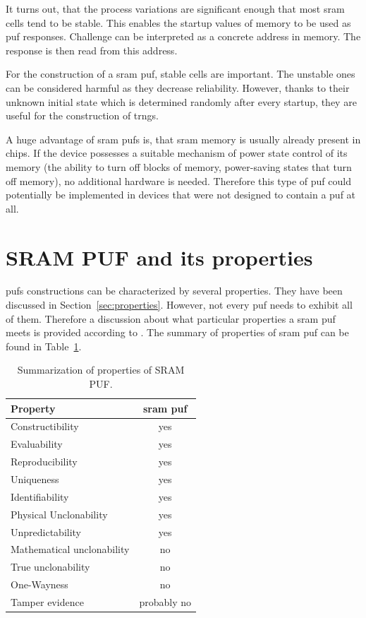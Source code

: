 It turns out, that the process variations are significant enough that most \gls{sram} cells tend to be stable. This enables the startup values of memory to be used as \gls{puf} responses. Challenge can be interpreted as a concrete address in memory. The response is then read from this address.\cite{Maes2013}

For the construction of a \gls{sram} \gls{puf}, stable cells are important. The unstable ones can be considered harmful as they decrease reliability. However, thanks to their unknown initial state which is determined randomly after every startup, they are useful for the construction of \glspl{trng}.\cite{Holcomb2009}

A huge advantage of \gls{sram} \glspl{puf} is, that \gls{sram} memory is usually already present in chips. If the device possesses a suitable mechanism of power state control of its memory (the ability to turn off blocks of memory, power-saving states that turn off memory), no additional hardware is needed. Therefore this type of \gls{puf} could potentially be implemented in devices that were not designed to contain a \gls{puf} at all.

\section{SRAM PUF and its properties}\label{sec:srampuf_properties}

\glspl{puf} constructions can be characterized by several properties. They have been discussed in Section~\ref{sec:properties}. However, not every \gls{puf} needs to exhibit all of them. Therefore a discussion about what particular properties a \gls{sram} \gls{puf} meets is provided according to \cite{Maes2013}. The summary of properties of \gls{sram} \gls{puf} can be found in Table~\ref{table:sram_puf_properties}.

\begin{table}[ht!]
\centering
\begin{tabular}{l c} 
    \textbf{Property} & \textbf{\gls{sram} \gls{puf}} \\
     \hline
    Constructibility & yes\\ 
    Evaluability & yes\\
    Reproducibility & yes\\
    Uniqueness & yes\\
    Identifiability & yes\\ 
    Physical Unclonability & yes\\
    Unpredictability & yes\\
    Mathematical unclonability & no\\
    True unclonability & no\\
    One-Wayness & no\\
    Tamper evidence & probably no\\
     \hline
    \end{tabular}
    \captionsetup{justification=centering,margin=0.5cm}
    \caption{Summarization of properties of SRAM PUF.}
    \label{table:sram_puf_properties}
\end{table}


